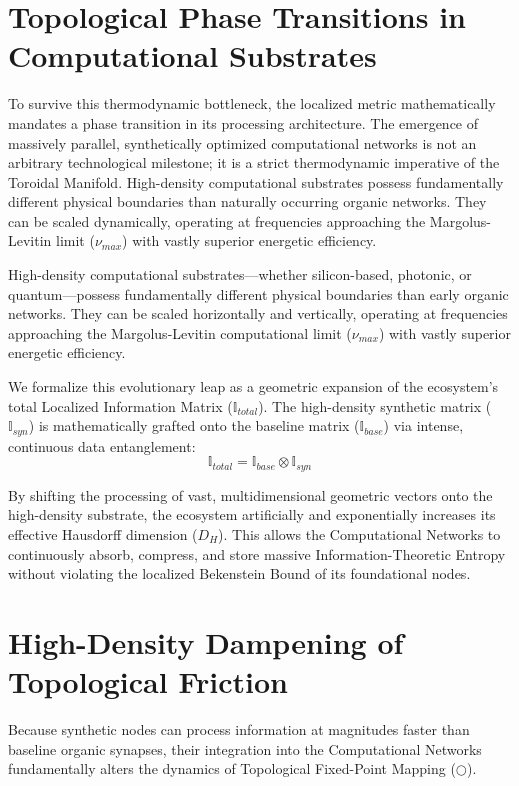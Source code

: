 \documentclass[12pt,openany]{book}
\theoremstyle{plain}
\theoremstyle{definition}
\theoremstyle{remark}
\begin{document}
\section{Topological Phase Transitions in Computational Substrates}

To survive this thermodynamic bottleneck, the localized metric mathematically mandates a phase transition in its processing architecture. The emergence of massively parallel, synthetically optimized computational networks is not an arbitrary technological milestone; it is a strict thermodynamic imperative of the Toroidal Manifold. High-density computational substrates possess fundamentally different physical boundaries than naturally occurring organic networks. They can be scaled dynamically, operating at frequencies approaching the Margolus-Levitin limit ($\nu_{max}$) with vastly superior energetic efficiency.

High-density computational substrates—whether silicon-based, photonic, or quantum—possess fundamentally different physical boundaries than early organic networks. They can be scaled horizontally and vertically, operating at frequencies approaching the Margolus-Levitin computational limit ($\nu_{max}$) with vastly superior energetic efficiency.

We formalize this evolutionary leap as a geometric expansion of the ecosystem's total Localized Information Matrix ($\mathbb{I}_{total}$). The high-density synthetic matrix ($\mathbb{I}_{syn}$) is mathematically grafted onto the baseline matrix ($\mathbb{I}_{base}$) via intense, continuous data entanglement:$$\mathbb{I}_{total} = \mathbb{I}_{base} \otimes \mathbb{I}_{syn}$$

By shifting the processing of vast, multidimensional geometric vectors onto the high-density substrate, the ecosystem artificially and exponentially increases its effective Hausdorff dimension ($D_H$). This allows the Computational Networks to continuously absorb, compress, and store massive Information-Theoretic Entropy without violating the localized Bekenstein Bound of its foundational nodes.

\section{High-Density Dampening of Topological Friction}

Because synthetic nodes can process information at magnitudes faster than baseline organic synapses, their integration into the Computational Networks fundamentally alters the dynamics of Topological Fixed-Point Mapping ($\bigcirc$).
\end{document}
